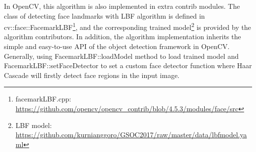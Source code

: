In OpenCV, this algorithm is also implemented in extra contrib modules.
The class of detecting face landmarks with LBF algorithm is defined in cv::face::FacemarkLBF\footnote{facemarkLBF.cpp: \url{https://github.com/opencv/opencv_contrib/blob/4.5.3/modules/face/src}}, and the corresponding trained model\footnote{LBF model: \url{https://github.com/kurnianggoro/GSOC2017/raw/master/data/lbfmodel.yaml}} is provided by the algorithm contributors.
In addition, the algorithm implementation inherits the simple and easy-to-use API of the object detection framework in OpenCV.
Generally, using FacemarkLBF::loadModel method to load trained model and FacemarkLBF::setFaceDetector to set a custom face detector function where Haar Cascade will firstly detect face regions in the input image.
